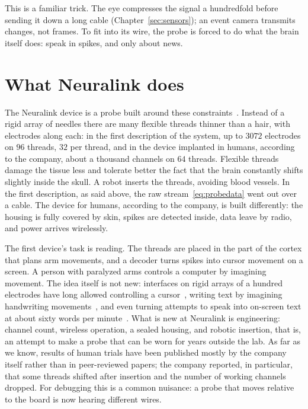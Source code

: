 This is a familiar trick. The eye compresses the signal a hundredfold before sending it down a long cable (Chapter~\ref{sec:sensors}); an event camera transmits changes, not frames. To fit into its wire, the probe is forced to do what the brain itself does: speak in spikes, and only about news.

\section{What Neuralink does}

The Neuralink device is a probe built around these constraints~\cite{Musk2019}. Instead of a rigid array of needles there are many flexible threads thinner than a hair, with electrodes along each: in the first description of the system, up to $3072$ electrodes on $96$ threads, $32$ per thread, and in the device implanted in humans, according to the company, about a thousand channels on $64$ threads. Flexible threads damage the tissue less and tolerate better the fact that the brain constantly shifts slightly inside the skull. A robot inserts the threads, avoiding blood vessels. In the first description, as said above, the raw stream~\eqref{eq:probedata} went out over a cable. The device for humans, according to the company, is built differently: the housing is fully covered by skin, spikes are detected inside, data leave by radio, and power arrives wirelessly.

The first device's task is reading. The threads are placed in the part of the cortex that plans arm movements, and a decoder turns spikes into cursor movement on a screen. A person with paralyzed arms controls a computer by imagining movement. The idea itself is not new: interfaces on rigid arrays of a hundred electrodes have long allowed controlling a cursor~\cite{Hochberg2006}, writing text by imagining handwriting movements~\cite{Willett2021}, and even turning attempts to speak into on-screen text at about sixty words per minute~\cite{Willett2023}. What is new at Neuralink is engineering: channel count, wireless operation, a sealed housing, and robotic insertion, that is, an attempt to make a probe that can be worn for years outside the lab. As far as we know, results of human trials have been published mostly by the company itself rather than in peer-reviewed papers; the company reported, in particular, that some threads shifted after insertion and the number of working channels dropped. For debugging this is a common nuisance: a probe that moves relative to the board is now hearing different wires.

